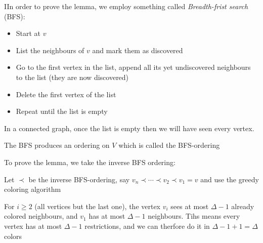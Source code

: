 \begin{prf}
  IIn order to prove the lemma, we employ something called \textit{Breadth-frist search} (BFS):\par
  \begin{itemize}
    \item Start at $v$\par
    \item List the neighbours of $v$ and mark them as discovered\par
    \item Go to the first vertex in the list, append all its yet undiscovered neighbours to the list (they are now discovered)\par
    \item Delete the first vertex of the list\par
    \item Repeat until the list is empty
  \end{itemize}
  \par\bigskip
  \noindent In a connected graph, once the list is empty then we will have seen every vertex.
  \par\bigskip
  \noindent The BFS produces an ordering on $V$ which is called the BFS-ordering
  \par\bigskip
  \noindent To prove the lemma, we take the inverse BFS ordering:\par
  Let $\prec$ be the inverse BFS-ordering, say $v_n\prec\cdots\prec v_2\prec v_1  = v$ and use the greedy coloring algorithm
  \par\bigskip
  \noindent For $i\geq2$ (all vertices but the last one), the vertex $v_i$ sees at most $\Delta-1$ already colored neighbours, and $v_1$ has at most $\Delta-1$ neighbours. Tihs means every vertex has at most $\Delta-1$ restrictions, and we can therfore do it in $\Delta-1+1 = \Delta$ colors\par
\end{prf}
\newpage
